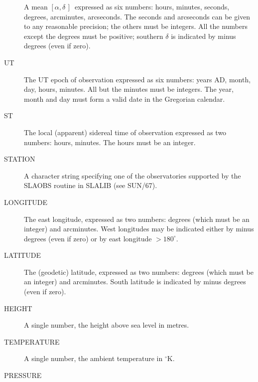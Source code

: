 \documentclass[twoside,11pt]{article}
\newcommand{\xref}[3]{#1}
\newcommand{\xlabel}[1]{}
\renewcommand{\_}{\texttt{\symbol{95}}}
\newcommand{\radec}     {$[\alpha,\delta\,]$}
\begin{document}
\begin{description}
A mean \radec\ expressed as six numbers: hours, minutes, seconds,
degrees, arcminutes, arcseconds.  The seconds and arcseconds can be
given to any reasonable precision;  the others must be integers.  All
the numbers except the degrees must be positive; southern $\delta$ is
indicated by minus degrees (even if zero).

\goodbreak
\item[\xlabel{UT}UT]\mbox{}

The UT epoch of observation expressed as six numbers: years AD, month,
day, hours, minutes.  All but the minutes must be integers.  The year,
month and day must form a valid date in the Gregorian calendar.

\goodbreak
\item[\xlabel{ST}ST]\mbox{}

The local (apparent) sidereal time of observation expressed as two
numbers: hours, minutes.  The hours must be an integer.

\goodbreak
\item[\xlabel{STATION}STATION]\mbox{}

A character string specifying one of the observatories supported by
the \xref{SLA\_OBS}{sun67}{SLA_OBS} routine in \xref{SLALIB}{sun67}{}
(see SUN/67).

\goodbreak
\item[\xlabel{LONGITUDE}LONGITUDE]\mbox{}

The east longitude, expressed as two numbers: degrees (which must be an
integer) and arcminutes.  West longitudes may be indicated either by
minus degrees (even if zero) or by east longitude $> 180^\circ$.

\goodbreak
\item[\xlabel{LATITUDE}LATITUDE]\mbox{}

The (geodetic) latitude, expressed as two numbers: degrees (which must
be an integer) and arcminutes.  South latitude is indicated by minus
degrees (even if zero).

\goodbreak
\item[\xlabel{HEIGHT}HEIGHT]\mbox{}

 A single number, the height above sea level in metres.

\goodbreak
\item[\xlabel{TEMPERATURE}TEMPERATURE]\mbox{}

A single number, the ambient temperature in $^\circ$K.

\goodbreak
\item[\xlabel{PRESSURE}PRESSURE]\mbox{}


\end{description}
\end{document}

